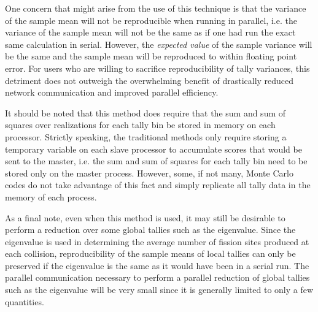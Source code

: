 One concern that might arise from the use of this technique is that the variance
of the sample mean will not be reproducible when running in parallel, i.e. the
variance of the sample mean will not be the same as if one had run the exact
same calculation in serial. However, the {\it expected value} of the sample
variance will be the same and the sample mean will be reproduced to within
floating point error. For users who are willing to sacrifice reproducibility of
tally variances, this detriment does not outweigh the overwhelming benefit of
drastically reduced network communication and improved parallel efficiency.

It should be noted that this method does require that the sum and sum of squares
over realizations for each tally bin be stored in memory on each
processor. Strictly speaking, the traditional methods only require storing a
temporary variable on each slave processor to accumulate scores that would be
sent to the master, i.e. the sum and sum of squares for each tally bin need to
be stored only on the master process. However, some, if not many, Monte Carlo
codes do not take advantage of this fact and simply replicate all tally data in
the memory of each process.

As a final note, even when this method is used, it may still be desirable to
perform a reduction over some global tallies such as the eigenvalue. Since the
eigenvalue is used in determining the average number of fission sites produced
at each collision, reproducibility of the sample means of local tallies can only
be preserved if the eigenvalue is the same as it would have been in a serial
run. The parallel communication necessary to perform a parallel reduction of
global tallies such as the eigenvalue will be very small since it is generally
limited to only a few quantities.
